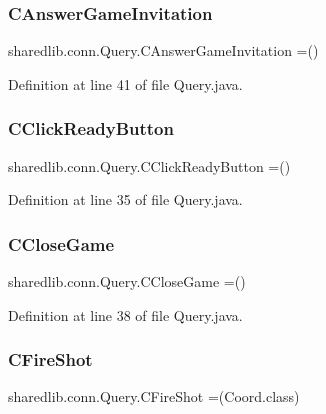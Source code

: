 \subsubsection{\texorpdfstring{C\+Answer\+Game\+Invitation}{CAnswerGameInvitation}}
{\footnotesize\ttfamily sharedlib.\+conn.\+Query.\+C\+Answer\+Game\+Invitation =()}



Definition at line 41 of file Query.\+java.

\hypertarget{enumsharedlib_1_1conn_1_1_query_af12eeca0b0f06cfde5cac9d2b8a9b7c3}{}\label{enumsharedlib_1_1conn_1_1_query_af12eeca0b0f06cfde5cac9d2b8a9b7c3} 
\subsubsection{\texorpdfstring{C\+Click\+Ready\+Button}{CClickReadyButton}}
{\footnotesize\ttfamily sharedlib.\+conn.\+Query.\+C\+Click\+Ready\+Button =()}



Definition at line 35 of file Query.\+java.

\hypertarget{enumsharedlib_1_1conn_1_1_query_aaf769eea78a5d5c66224ab8492383724}{}\label{enumsharedlib_1_1conn_1_1_query_aaf769eea78a5d5c66224ab8492383724} 
\subsubsection{\texorpdfstring{C\+Close\+Game}{CCloseGame}}
{\footnotesize\ttfamily sharedlib.\+conn.\+Query.\+C\+Close\+Game =()}



Definition at line 38 of file Query.\+java.

\hypertarget{enumsharedlib_1_1conn_1_1_query_af209e818f10f549b31d697a713e0c497}{}\label{enumsharedlib_1_1conn_1_1_query_af209e818f10f549b31d697a713e0c497} 
\subsubsection{\texorpdfstring{C\+Fire\+Shot}{CFireShot}}
{\footnotesize\ttfamily sharedlib.\+conn.\+Query.\+C\+Fire\+Shot =(Coord.\+class)}



